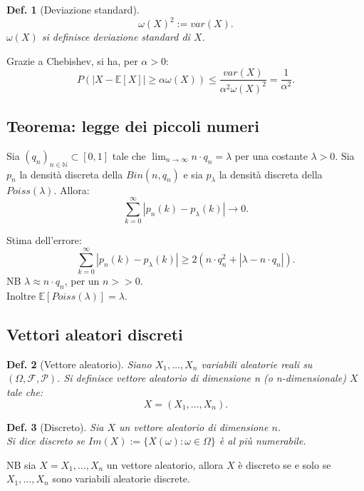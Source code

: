 \documentclass{article}
\newtheorem{definition}{Def.}[section]
\begin{document}
\begin{definition}[Deviazione standard]
	\begin{equation}
		\omega(X)^2 := var(X).
	\end{equation}
	$\omega(X)$ si definisce deviazione standard di $X$.
\end{definition}

Grazie a Chebishev, si ha, per $\alpha > 0$:
\begin{equation}
	P(|X - \mathbb{E}[X]| \geq \alpha \omega(X)) \leq \frac{var(X)}{\alpha^2
		\omega(X)^2} = \frac{1}{\alpha^2}.
\end{equation}

\subsection{Teorema: legge dei piccoli numeri}
Sia $(q_n)_{n \in \mathbb{N}} \subset [0, 1]$ tale che $\lim_{n \to \infty} n
\cdot q_n = \lambda$ per una costante $\lambda > 0$. Sia $p_n$ la densità
discreta della $Bin(n, q_n)$ e sia $p_{\lambda}$ la densità discreta della
$Poiss(\lambda)$. Allora:
\begin{equation}
	\sum_{k = 0}^{\infty} | p_n(k) - p_{\lambda}(k) | \to 0.
\end{equation}

Stima dell'errore:
\begin{equation}
	\sum_{k = 0}^{\infty} | p_n(k) - p_{\lambda}(k) | \geq 2(n \cdot q_n^2 +
	|\lambda - n \cdot q_n|).
\end{equation}
NB $\lambda \approx n \cdot q_n$, per un $n>>0$.\\
Inoltre $\mathbb{E}[Poiss(\lambda)] = \lambda$.

\subsection{Vettori aleatori discreti}
\begin{definition}[Vettore aleatorio]
	Siano $X_1, \dots, X_n$ variabili aleatorie reali su $(\Omega,
	\mathcal{F, P})$. Si definisce vettore aleatorio di dimensione n (o
	n-dimensionale) $X$ tale che:
	\begin{equation}
		X = (X_1, \dots, X_n).
	\end{equation}
\end{definition}

\begin{definition}[Discreto]
	Sia $X$ un vettore aleatorio di dimensione $n$.\\
	Si dice discreto se $Im(X):=\{X(\omega) : \omega \in \Omega\}$ è al più numerabile.
\end{definition}
NB sia $X= {X_1, \dots, X_n}$ un vettore aleatorio, allora $X$ è discreto se e
solo se $X_1, \dots, X_n$ sono variabili aleatorie discrete.
\end{document}
